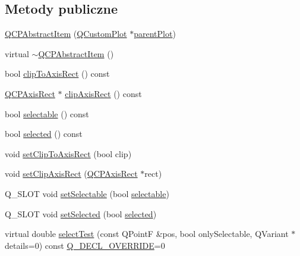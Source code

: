 \subsection*{Metody publiczne}
\begin{DoxyCompactItemize}
\item 
\hyperlink{class_q_c_p_abstract_item_a9922507d8b4503a1fe1ed0b1030e23b6}{Q\+C\+P\+Abstract\+Item} (\hyperlink{class_q_custom_plot}{Q\+Custom\+Plot} $\ast$\hyperlink{class_q_c_p_layerable_ab7e0e94461566093d36ffc0f5312b109}{parent\+Plot})
\item 
virtual \hyperlink{class_q_c_p_abstract_item_a375bd1b7d3218b04a6ff7ff06fff917c}{$\sim$\+Q\+C\+P\+Abstract\+Item} ()
\item 
bool \hyperlink{class_q_c_p_abstract_item_a5b0ea171823033bcb8aee81f4a034871}{clip\+To\+Axis\+Rect} () const 
\item 
\hyperlink{class_q_c_p_axis_rect}{Q\+C\+P\+Axis\+Rect} $\ast$ \hyperlink{class_q_c_p_abstract_item_a37f86618740b5047eae23eedb2de061a}{clip\+Axis\+Rect} () const 
\item 
bool \hyperlink{class_q_c_p_abstract_item_a9189e752025533e1595eaade0009a3bc}{selectable} () const 
\item 
bool \hyperlink{class_q_c_p_abstract_item_a225865808640d8d9a7dd19f09a2e93f2}{selected} () const 
\item 
void \hyperlink{class_q_c_p_abstract_item_a39e05b9d4176b9accafc746d16ca6a06}{set\+Clip\+To\+Axis\+Rect} (bool clip)
\item 
void \hyperlink{class_q_c_p_abstract_item_a7dc75fcbcd10206fe0b75d757ea7a347}{set\+Clip\+Axis\+Rect} (\hyperlink{class_q_c_p_axis_rect}{Q\+C\+P\+Axis\+Rect} $\ast$rect)
\item 
Q\+\_\+\+S\+L\+OT void \hyperlink{class_q_c_p_abstract_item_a8a8e32a55bc478b849756a78c2d87fd2}{set\+Selectable} (bool \hyperlink{class_q_c_p_abstract_item_a9189e752025533e1595eaade0009a3bc}{selectable})
\item 
Q\+\_\+\+S\+L\+OT void \hyperlink{class_q_c_p_abstract_item_a203de94ad586cc44d16c9565f49d3378}{set\+Selected} (bool \hyperlink{class_q_c_p_abstract_item_a225865808640d8d9a7dd19f09a2e93f2}{selected})
\item 
virtual double \hyperlink{class_q_c_p_abstract_item_ae41d0349d68bb802c49104afd100ba2a}{select\+Test} (const Q\+PointF \&pos, bool only\+Selectable, Q\+Variant $\ast$details=0) const \hyperlink{qcustomplot_8hh_a42cc5eaeb25b85f8b52d2a4b94c56f55}{Q\+\_\+\+D\+E\+C\+L\+\_\+\+O\+V\+E\+R\+R\+I\+DE}=0
\item 

\end{DoxyCompactItemize}
